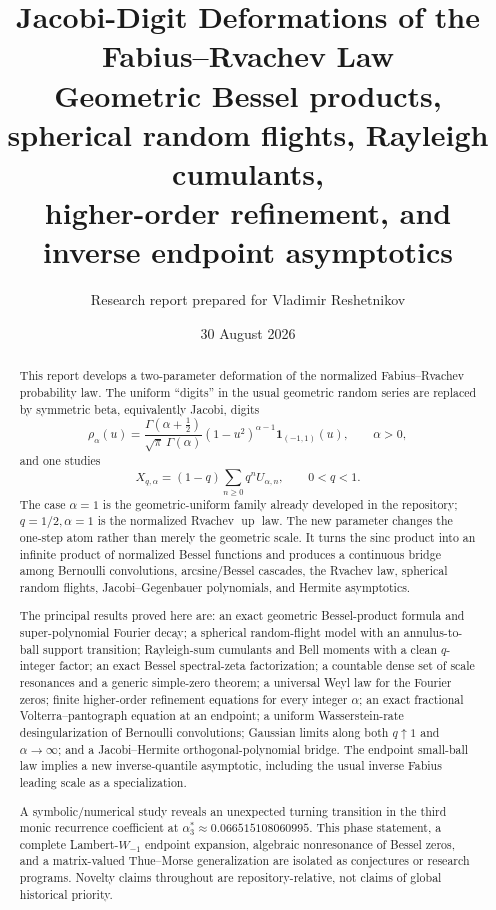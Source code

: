 \documentclass[11pt]{article}
\title{\textbf{Jacobi-Digit Deformations of the Fabius--Rvachev Law}\\[0.35em]
\large Geometric Bessel products, spherical random flights, Rayleigh cumulants,\\
higher-order refinement, and inverse endpoint asymptotics}
\author{Research report prepared for Vladimir Reshetnikov}
\date{30 August 2026}
\theoremstyle{definition}
\theoremstyle{remark}
\newcommand{\upf}{\operatorname{up}}
\begin{document}
\maketitle

\begin{abstract}
This report develops a two-parameter deformation of the normalized
Fabius--Rvachev probability law.  The uniform ``digits'' in the usual
geometric random series are replaced by symmetric beta, equivalently Jacobi,
digits
\[
 \rho_\alpha(u)=
 \frac{\Gamma(\alpha+\tfrac12)}{\sqrt\pi\,\Gamma(\alpha)}
 (1-u^2)^{\alpha-1}\mathbf 1_{(-1,1)}(u),
 \qquad \alpha>0,
\]
and one studies
\[
 X_{q,\alpha}=(1-q)\sum_{n\ge0}q^nU_{\alpha,n},\qquad 0<q<1.
\]
The case \(\alpha=1\) is the geometric-uniform family already developed in
the repository; \(q=1/2,\alpha=1\) is the normalized Rvachev \(\upf\) law.
The new parameter changes the one-step atom rather than merely the geometric
scale.  It turns the sinc product into an infinite product of normalized
Bessel functions and produces a continuous bridge among Bernoulli
convolutions, arcsine/Bessel cascades, the Rvachev law, spherical random
flights, Jacobi--Gegenbauer polynomials, and Hermite asymptotics.

The principal results proved here are: an exact geometric Bessel-product
formula and super-polynomial Fourier decay; a spherical random-flight model
with an annulus-to-ball support transition; Rayleigh-sum cumulants and Bell
moments with a clean \(q\)-integer factor; an exact Bessel spectral-zeta
factorization; a countable dense set of scale resonances and a generic
simple-zero theorem; a universal Weyl law for the Fourier zeros; finite
higher-order refinement equations for every integer \(\alpha\); an exact
fractional Volterra--pantograph equation at an endpoint; a uniform
Wasserstein-rate desingularization of Bernoulli convolutions; Gaussian limits
along both \(q\uparrow1\) and \(\alpha\to\infty\); and a
Jacobi--Hermite orthogonal-polynomial bridge.  The endpoint small-ball law
implies a new inverse-quantile asymptotic, including the usual inverse Fabius
leading scale as a specialization.

A symbolic/numerical study reveals an unexpected turning transition in the
third monic recurrence coefficient at
\(\alpha_3^*\approx0.066515108060995\).  This phase statement, a complete
Lambert-\(W_{-1}\) endpoint expansion, algebraic nonresonance of Bessel zeros,
and a matrix-valued Thue--Morse generalization are isolated as conjectures or
research programs.  Novelty claims throughout are repository-relative, not
claims of global historical priority.
\end{abstract}
\end{document}
